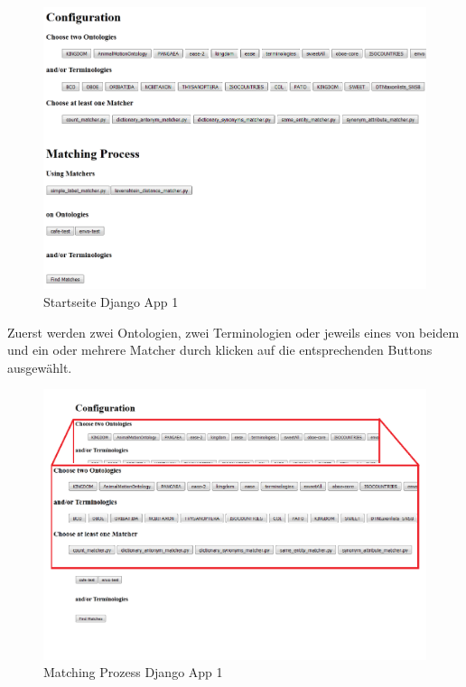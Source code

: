 		\begin{figure}[h!]
		\centering
		\includegraphics[width=1.0\textwidth]{pics/SimpleOntologyMatcher.png}
		\caption{Startseite Django App 1}
		\label{fig3}
		\end{figure}
		
		\pagebreak[4]
		Zuerst werden zwei Ontologien, zwei Terminologien oder jeweils eines von
		beidem und ein oder mehrere Matcher durch klicken auf die entsprechenden
		Buttons ausgewählt.
		\begin{figure}[h!]
		\centering
		\includegraphics[width=1.0\textwidth]{pics/SimpleOntologyMatcher-Process.png}
		\caption{Matching Prozess Django App 1}
		\label{fig4}
		\end{figure}
		
